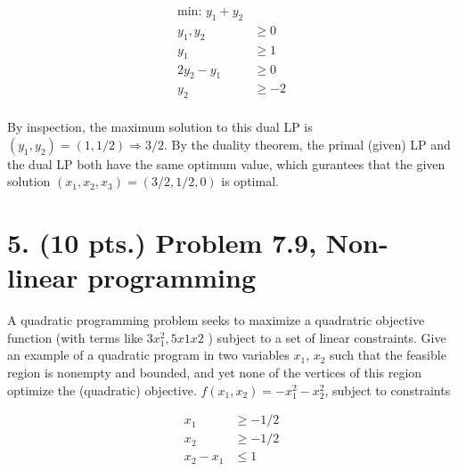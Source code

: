 \documentclass[11pt]{article}
\begin{document}
\begin{equation*}
  \begin{aligned}
    \mbox{min: }y_1+y_2&\\
    y_1,y_2 &\geq 0 \\
    y_1 &\geq 1 \\
    2y_2-y_1 &\geq 0\\
    y_2 &\geq -2 \\
  \end{aligned}
\end{equation*}

By inspection, the maximum solution to this dual LP is $(y_1,y_2)=(1,1/2)\Rightarrow 3/2$.
By the duality theorem, the primal (given) LP and the dual LP both have the same optimum value, 
which gurantees that the given solution $(x_1,x_2,x_3)=(3/2,1/2,0)$ is optimal.

\label{pg:end-of-p4}

%


\newpage

\section*{5. (10 pts.) Problem 7.9, Non-linear programming}

A quadratic programming problem seeks to maximize a quadratric objective function 
(with terms like $3x_1^2,5x1x2$ ) subject to a set of
linear constraints. Give an example of a quadratic program in two variables 
$x_1$, $x_2$ such that the feasible region is nonempty and bounded, and yet 
none of the vertices of this region optimize the (quadratic) objective.
\newline
\newline
$f(x_1,x_2)=  -x_1^2 -x_2^2$, subject to constraints 

\begin{equation*}
  \begin{aligned}
    x_1 &\geq -1/2\\
    x_2 &\geq -1/2\\
    x_2-x_1 &\leq 1
  \end{aligned}
\end{equation*}
\end{document}
